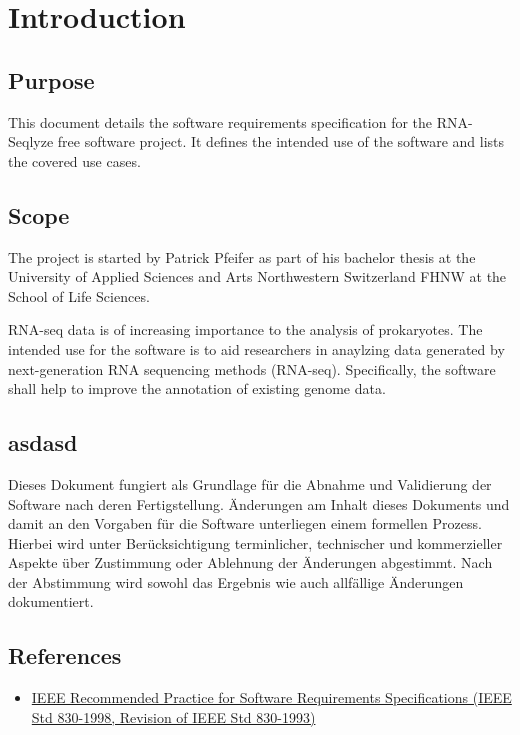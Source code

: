 \documentclass[a4paper]{srs}
\begin{document}

\tableofcontents
\newpage

	\section{Introduction}

\subsection{Purpose}
This document details the software requirements specification for the RNA-Seqlyze free software project. It defines the intended use of the software and lists the covered use cases.

\subsection{Scope}

The project is started by Patrick Pfeifer as part of his bachelor thesis at the University of Applied Sciences and Arts Northwestern 
Switzerland FHNW at the School of Life Sciences.

RNA-seq data is of increasing importance to the analysis of prokaryotes. The intended use for the software is to aid researchers in anaylzing data generated by next-generation RNA sequencing methods (RNA-seq). Specifically, the software shall help to improve the annotation of existing genome data.

\subsection{asdasd}

Dieses Dokument fungiert als Grundlage für die Abnahme und Validierung der Software nach deren Fertigstellung. Änderungen am Inhalt dieses Dokuments und damit an den Vorgaben für die Software unterliegen einem formellen Prozess. Hierbei wird unter Berücksichtigung terminlicher, technischer und kommerzieller Aspekte über Zustimmung oder Ablehnung der Änderungen abgestimmt. Nach der Abstimmung wird sowohl das Ergebnis wie auch allfällige Änderungen dokumentiert.


\subsection{References}
\begin{itemize}
\item \href{http://standards.ieee.org/findstds/standard/830-1998.html}{
	IEEE Recommended Practice for Software Requirements Specifications
	(IEEE Std 830-1998, Revision of IEEE Std 830-1993)}
\end{itemize}
\end{document}
